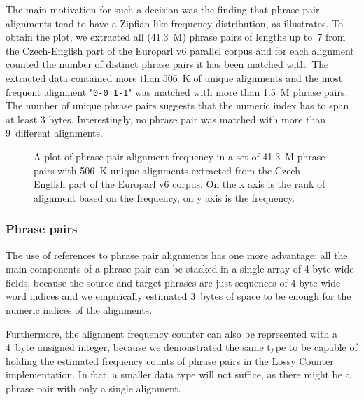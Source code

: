 The main motivation for such a decision was the finding that phrase pair alignments tend to
have a Zipfian-like frequency distribution, as  illustrates.
To obtain the plot, we extracted all (41.3~M) phrase pairs of lengths up to~7 from
the Czech-English part of the Europarl v6 parallel corpus and for each alignment counted
the number of distinct phrase pairs it has been matched with.
The extracted data contained more than 506~K of unique alignments and the most frequent
alignment "\texttt{0-0 1-1}" was matched with more than 1.5~M phrase pairs.
The number of unique phrase pairs suggests that the numeric index has to span at least
3 bytes.
Interestingly, no phrase pair was matched with more than 9~different alignments.

\begin{figure}[ht]
  
  \caption{
    A plot of phrase pair alignment frequency in a set of 41.3~M phrase pairs with
    506~K unique alignments extracted from the Czech-English part of the Europarl v6 corpus.
    On the x axis is the rank of alignment based on the frequency, on y axis is the frequency.
  }
  \label{fig:alignment-dist}
\end{figure}

\subsubsection*{Phrase pairs}

The use of references to phrase pair alignments has one more advantage: all the main
components of a phrase pair can be stacked in a single array of 4-byte-wide fields,
because the source and target phrases are just sequences of 4-byte-wide word indices
and we empirically estimated 3~bytes of space to be enough for the numeric indices
of the alignments.

Furthermore, the alignment frequency counter can also be represented with a 4~byte
unsigned integer, because we demonstrated the same type to be capable of holding
the estimated frequency counts of phrase pairs in the Lossy Counter implementation.
In fact, a smaller data type will not suffice, as there might be a phrase pair with
only a single alignment.

